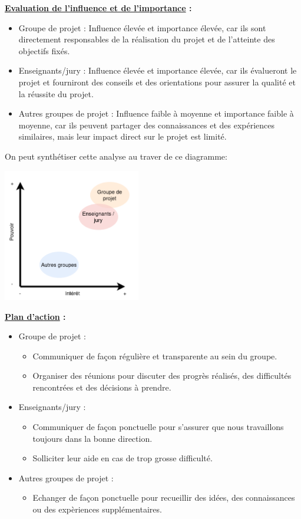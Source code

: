 \documentclass[a4paper, 12pt]{report}
\begin{document}
\textbf{\underline{Evaluation de l'influence et de l'importance} :}
\begin{itemize}
    \item Groupe de projet : Influence élevée et importance élevée, car ils sont directement responsables de la réalisation du projet et de l'atteinte des objectifs fixés.
    \item Enseignants/jury : Influence élevée et importance élevée, car ils évalueront le projet et fourniront des conseils et des orientations pour assurer la qualité et la réussite du projet.
    \item Autres groupes de projet : Influence faible à moyenne et importance faible à moyenne, car ils peuvent partager des connaissances et des expériences similaires, mais leur impact direct sur le projet est limité.
\end{itemize}
\bigskip

On peut synthétiser cette analyse au traver de ce diagramme:

\begin{center}
    \includegraphics[width = 0.45\textwidth]{IMG/parties_prenantes.png}
\end{center}

\textbf{\underline{Plan d'action} :}
\begin{itemize}
    \item Groupe de projet : 
    \begin{itemize}
        \item Communiquer de façon régulière et transparente au sein du groupe.
        \item Organiser des réunions pour discuter des progrès réalisés, des difficultés rencontrées et des décisions à prendre.
    \end{itemize}
    \item Enseignants/jury :
    \begin{itemize}
        \item Communiquer de façon ponctuelle pour s'assurer que nous travaillons toujours dans la bonne direction.
        \item Solliciter leur aide en cas de trop grosse difficulté.
    \end{itemize}
    \item Autres groupes de projet : 
    \begin{itemize}
        \item Echanger de façon ponctuelle pour recueillir des idées, des connaissances ou des expèriences supplémentaires.
    \end{itemize}
\end{itemize}
\end{document}

